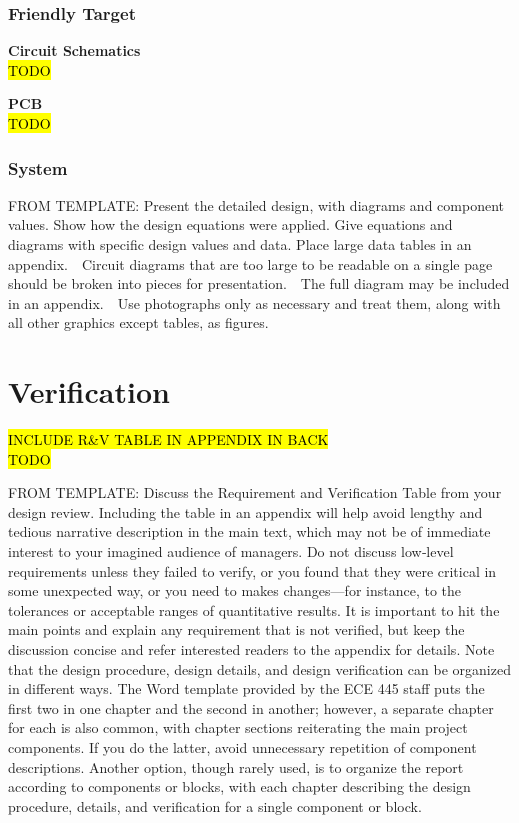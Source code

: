 \documentclass[letterpaper,10pt]{article}
\begin{document}
\begin{spacing}{1.15}
\subsubsection{Friendly Target}
\hspace{5mm}\textbf{Circuit Schematics} \label{section:target-circuit-schematics-design-details}
\\ \hl{TODO}

\hspace{5mm}\textbf{PCB} \label{section:target-pcb-design-details}
\\ \hl{TODO}


\subsubsection{System}

FROM TEMPLATE: Present the detailed design, with diagrams and component values. Show how the design equations were applied. Give equations and diagrams with specific design values and data. Place large data tables in an appendix.  Circuit diagrams that are too large to be readable on a single page should be broken into pieces for presentation.  The full diagram may be included in an appendix.  Use photographs only as necessary and treat them, along with all other graphics except tables, as figures.


\section{Verification}
\hl{INCLUDE R\&V TABLE IN APPENDIX IN BACK}
\\ \hl{TODO}

FROM TEMPLATE: Discuss the Requirement and Verification Table from your design review. Including the table in an appendix will help avoid lengthy and tedious narrative description in the main text, which may not be of immediate interest to your imagined audience of managers. Do not discuss low‐level requirements unless they failed to verify, or you found that they were critical in some unexpected way, or you need to makes changes—for instance, to the tolerances or acceptable ranges of quantitative results. It is important to hit the main points and explain any requirement that is not verified, but keep the discussion concise and refer interested readers to the appendix for details. Note that the design procedure, design details, and design verification can be organized in different ways. The Word template provided by the ECE 445 staff puts the first two in one chapter and the second in another; however, a separate chapter for each is also common, with chapter sections reiterating the main project components. If you do the latter, avoid unnecessary repetition of component descriptions. Another option, though rarely used, is to organize the report according to components or blocks, with each chapter describing the design procedure, details, and verification for a single component or block.


\end{spacing}
\end{document}

